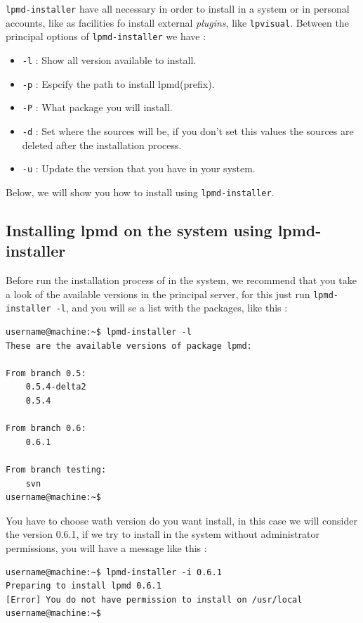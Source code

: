 \verb|lpmd-installer| have all necessary in order to install {\lpmd} in a
system or in personal accounts, like as facilities fo install external
\textit{plugins}, like \verb|lpvisual|. Between the principal options of
\verb|lpmd-installer| we have :

\begin{itemize}
 \item \verb|-l| : Show all version available to install.
 \item \verb|-p| : Espcify the path to install lpmd(prefix).
 \item \verb|-P| : What package you will install.
 \item \verb|-d| : Set where the sources will be, if you don't set this values
the sources are deleted after the installation process.
 \item \verb|-u| : Update the {\lpmd} version that you have in your system.
\end{itemize}

Below, we will show you how to install {\lpmd} using \verb|lpmd-installer|.

\subsection{Installing lpmd on the system using lpmd-installer}

Before run the installation process of {\lpmd} in the system, we recommend that
you take a look of the available versions in the principal server, for this
just run \verb|lpmd-installer -l|, and you will se a list with the packages,
like this :

\begin{verbatim}
username@machine:~$ lpmd-installer -l
These are the available versions of package lpmd:

From branch 0.5: 
    0.5.4-delta2
    0.5.4

From branch 0.6: 
    0.6.1

From branch testing: 
    svn
username@machine:~$
\end{verbatim}

You have to choose wath version do you want install, in this case we will
consider the version 0.6.1, if we try to install in the system without
administrator permissions, you will have a message like this :

\begin{verbatim}
username@machine:~$ lpmd-installer -i 0.6.1
Preparing to install lpmd 0.6.1
[Error] You do not have permission to install on /usr/local
username@machine:~$
\end{verbatim}

